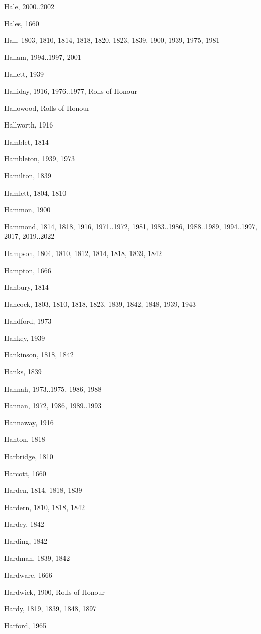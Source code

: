\begin{theindex}
\item Hale, 2000..2002
\item Hales, 1660
\item Hall, 1803, 1810, 1814, 1818, 1820, 1823, 1839, 1900, 1939, 1975, 1981
\item Hallam, 1994..1997, 2001
\item Hallett, 1939
\item Halliday, 1916, 1976..1977, Rolls of Honour
\item Hallowood, Rolls of Honour
\item Hallworth, 1916
\item Hamblet, 1814
\item Hambleton, 1939, 1973
\item Hamilton, 1839
\item Hamlett, 1804, 1810
\item Hammon, 1900
\item Hammond, 1814, 1818, 1916, 1971..1972, 1981, 1983..1986, 1988..1989, 1994..1997, 2017, 2019..2022
\item Hampson, 1804, 1810, 1812, 1814, 1818, 1839, 1842
\item Hampton, 1666
\item Hanbury, 1814
\item Hancock, 1803, 1810, 1818, 1823, 1839, 1842, 1848, 1939, 1943
\item Handford, 1973
\item Hankey, 1939
\item Hankinson, 1818, 1842
\item Hanks, 1839
\item Hannah, 1973..1975, 1986, 1988
\item Hannan, 1972, 1986, 1989..1993
\item Hannaway, 1916
\item Hanton, 1818
\item Harbridge, 1810
\item Harcott, 1660
\item Harden, 1814, 1818, 1839
\item Hardern, 1810, 1818, 1842
\item Hardey, 1842
\item Harding, 1842
\item Hardman, 1839, 1842
\item Hardware, 1666
\item Hardwick, 1900, Rolls of Honour
\item Hardy, 1819, 1839, 1848, 1897
\item Harford, 1965

\end{theindex}
